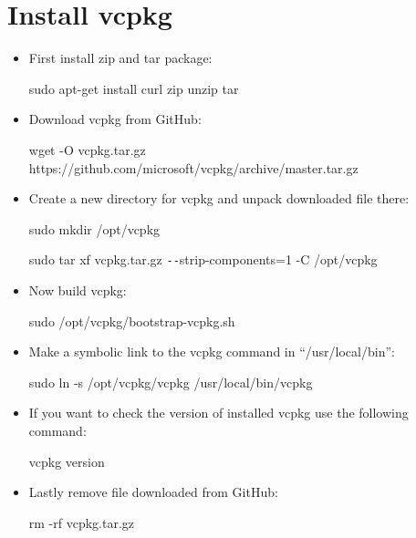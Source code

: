 \documentclass[a4paper,12pt]{book}
\begin{document}
\section{Install vcpkg}
\begin{itemize}
	\item First install zip and tar package:
	
	\vspace{3mm}
	sudo apt-get install curl zip unzip tar
	\vspace{3mm}
	
	\item Download vcpkg from GitHub:
	
	\vspace{3mm}
	wget -O vcpkg.tar.gz https://github.com/microsoft/vcpkg/archive/master.tar.gz
	\vspace{3mm}
	
	\item Create a new directory for vcpkg and unpack downloaded file there:
	
	\vspace{3mm}
	sudo mkdir /opt/vcpkg
	
	\vspace{0.05mm}
	sudo tar xf vcpkg.tar.gz \texttt{-{}-}strip-components=1 -C /opt/vcpkg
	\vspace{3mm}
	
	\item Now build vcpkg:
	
	\vspace{3mm}
	sudo /opt/vcpkg/bootstrap-vcpkg.sh
	\vspace{3mm}
	
	\item Make a symbolic link to the vcpkg command in “/usr/local/bin”:
	
	\vspace{3mm}
	sudo ln -s /opt/vcpkg/vcpkg /usr/local/bin/vcpkg
	\vspace{3mm}
	
	\item If you want to check the version of installed vcpkg use the following command:
	
	\vspace{3mm}
	vcpkg version
	\vspace{3mm}
	
	\item Lastly remove file downloaded from GitHub:
	
	\vspace{3mm}
	rm -rf vcpkg.tar.gz
	\vspace{3mm}
\end{itemize}
\end{document}
